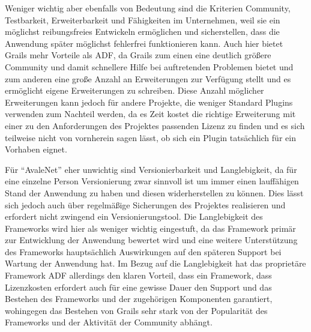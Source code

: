 Weniger wichtig aber ebenfalls von Bedeutung sind die Kriterien Community, Testbarkeit, Erweiterbarkeit und Fähigkeiten im Unternehmen, weil sie ein möglichst reibungsfreies Entwickeln ermöglichen und sicherstellen, dass die Anwendung später möglichst fehlerfrei funktionieren kann. Auch hier bietet Grails mehr Vorteile als ADF, da Grails zum einen eine deutlich größere Community und damit schnellere Hilfe bei auftretenden Problemen bietet und zum anderen eine große Anzahl an Erweiterungen zur Verfügung stellt und es ermöglicht eigene Erweiterungen zu schreiben. Diese Anzahl möglicher Erweiterungen kann jedoch für andere Projekte, die weniger Standard Plugins verwenden zum Nachteil werden, da es Zeit kostet die richtige Erweiterung mit einer zu den Anforderungen des Projektes passenden Lizenz zu finden und es sich teilweise nicht von vornherein sagen lässt, ob sich ein Plugin tatsächlich für ein Vorhaben eignet.

Für "`AvaleNet"' eher unwichtig sind Versionierbarkeit und Langlebigkeit, da für eine einzelne Person Versionierung zwar sinnvoll ist um immer einen lauffähigen Stand der Anwendung zu haben und diesen widerherstellen zu können. Dies lässt sich jedoch auch über regelmäßige Sicherungen des Projektes realisieren und erfordert nicht zwingend ein Versionierungstool. Die Langlebigkeit des Frameworks wird hier als weniger wichtig eingestuft, da das Framework primär zur Entwicklung der Anwendung bewertet wird und eine weitere Unterstützung des Frameworks hauptsächlich Auswirkungen auf den späteren Support bei Wartung der Anwendung hat. Im Bezug auf die Langlebigkeit hat das proprietäre Framework ADF allerdings den klaren Vorteil, dass ein Framework, dass Lizenzkosten erfordert auch für eine gewisse Dauer den Support und das Bestehen des Frameworks und der zugehörigen Komponenten garantiert, wohingegen das Bestehen von Grails sehr stark von der Popularität des Frameworks und der Aktivität der Community abhängt.